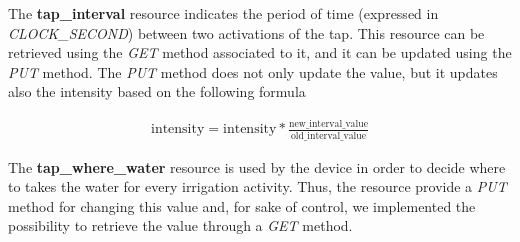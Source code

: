 The \textbf{tap\_interval} resource indicates the period of time (expressed in \textit{CLOCK\_SECOND}) between two activations of the tap. This resource can be retrieved using the \textit{GET} method associated to it, and it can be updated using the \textit{PUT} method. The \textit{PUT} method does not only update the value, but it updates also the intensity based on the following formula

\begin{equation}\label{eq1}
  \begin{gathered}
    \text{intensity} = \text{intensity} * \frac{\text{new\_interval\_value}}{\text{old\_interval\_value}}
  \end{gathered}
\end{equation}

The \textbf{tap\_where\_water} resource is used by the device in order to decide where to takes the water for every irrigation activity. Thus, the resource provide a \textit{PUT} method for changing this value and, for sake of control, we implemented the possibility to retrieve the value through a \textit{GET} method.